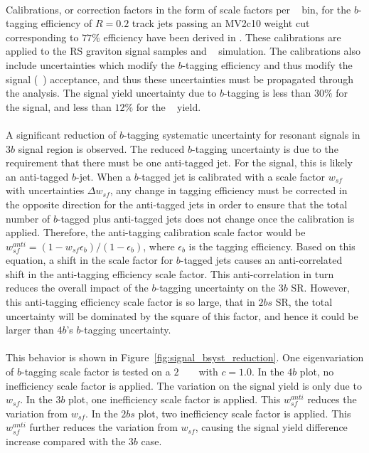 \paragraph{}
Calibrations, or correction factors in the form of scale factors per \pt~ bin, for the $b$-tagging efficiency of $R=0.2$ track jets passing an MV2c10 weight cut corresponding to $77\%$ efficiency have been derived in \cite{ATL-COM-PHYS-2015-009, ATL-COM-PHYS-2015-1323}.  
These calibrations are applied to the RS graviton signal samples and \ttbar~ simulation.  
The calibrations also include uncertainties which modify the $b$-tagging efficiency and thus modify the signal (\ttbar~) acceptance, and thus these uncertainties must be  propagated through the analysis.
The signal yield uncertainty due to $b$-tagging is less than $30\%$ for the signal, and less than $12\%$ for the \ttbar~ yield.

\paragraph{}
A significant reduction of $b$-tagging systematic uncertainty for resonant signals in $3b$ signal region is observed. 
The reduced $b$-tagging uncertainty is due to the requirement that there must be one anti-tagged jet.
For the signal, this is likely an anti-tagged $b$-jet.
When a $b$-tagged jet is calibrated with a scale factor $w_{sf}$ with uncertainties $\Delta w_{sf}$, any change in tagging efficiency must be corrected in the opposite direction for the anti-tagged jets in order to ensure that the total number of $b$-tagged plus anti-tagged jets does not change once the calibration is applied. 
Therefore, the anti-tagging calibration scale factor would be $w_{sf}^{anti} = (1 - w_{sf} \epsilon_{b}) / (1 - \epsilon_{b}) $, where $\epsilon_{b}$ is the tagging efficiency. 
Based on this equation, a shift in the scale factor for $b$-tagged jets causes an anti-correlated shift in the anti-tagging efficiency scale factor. 
This anti-correlation in turn reduces the overall impact of the $b$-tagging uncertainty on the $3b$ SR. 
However, this anti-tagging efficiency scale factor is so large, that in $2bs$ SR, the total uncertainty will be dominated by the square of this factor, and hence it could be larger than $4b$'s $b$-tagging uncertainty.

\paragraph{}
This behavior is shown in Figure~\ref{fig:signal_bsyst_reduction}.
One eigenvariation of $b$-tagging scale factor is tested on a $2$ \TeV~ \Grav~ with $c=1.0$.
In the $4b$ plot, no inefficiency scale factor is applied. 
The variation on the signal yield is only due to $w_{sf}$.
In the $3b$ plot, one inefficiency scale factor is applied. 
This $w_{sf}^{anti}$ reduces the variation from $w_{sf}$.
In the $2bs$ plot, two inefficiency scale factor is applied. 
This $w_{sf}^{anti}$ further reduces the variation from $w_{sf}$, causing the signal yield difference increase compared with the $3b$ case.


